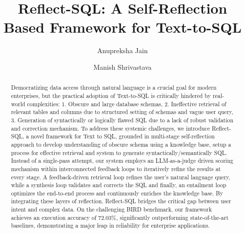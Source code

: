 \documentclass[runningheads]{llncs}
\begin{document}
%
\title{Reflect-SQL: A Self-Reflection Based Framework for Text-to-SQL}
%
%
\author{Anupreksha Jain \and
Manish Shrivastava}
%
%
%
%
\maketitle              %
%
\begin{abstract}
Democratizing data access through natural language is a crucial goal for modern enterprises, but the practical adoption of Text-to-SQL is critically hindered by real-world complexities: 1. Obscure and large database schemas, 2. Ineffective retrieval of relevant tables and columns due to structured setting of schemas and vague user query, 3.  Generation of syntactically or logically flawed SQL due to a lack of robust validation and correction mechanism. To address these systemic challenges, we introduce Reflect-SQL, a novel framework for Text to SQL, grounded in multi-stage self-reflection approach to develop understanding of obscure schema using a knowledge base, setup a process for effective retrieval and system to generate syntactically/semantically SQL. Instead of a single-pass attempt, our system employs an LLM-as-a-judge driven scoring mechanism within interconnected feedback loops to iteratively refine the results at every stage. A feedback-driven retrieval loop refines the user's natural language query, while a synthesis loop validates and corrects the SQL and finally, an entailment loop optimizes the end-to-end process and continuously enriches the knowledge base. By integrating these layers of reflection, Reflect-SQL bridges the critical gap between user intent and complex data. On the challenging BIRD benchmark, our framework achieves an execution accuracy of 72.03\%, significantly outperforming state-of-the-art baselines, demonstrating a major leap in reliability for enterprise applications.


\end{abstract}
%
%
%
\end{document}

